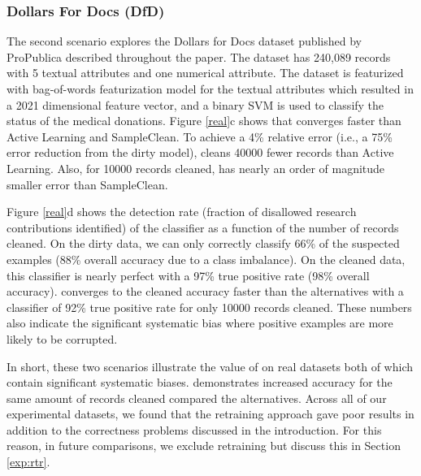 \subsubsection{Dollars For Docs (DfD)}\label{exp:dfd}
The second scenario explores the Dollars for Docs dataset published by ProPublica described throughout the paper.
The dataset has 240,089 records with 5 textual attributes and one numerical attribute.
The dataset is featurized with bag-of-words featurization model for the textual attributes which resulted in a 2021 dimensional feature vector, and a binary SVM is used to classify the status of the medical donations.
Figure \ref{real}c shows that \sys converges faster than Active Learning and SampleClean.
To achieve a 4\% relative error (i.e., a 75\% error reduction from the dirty model), \sys cleans 40000 fewer records than Active Learning.
Also, for 10000 records cleaned, \sys has nearly an order of magnitude smaller error than SampleClean.

Figure \ref{real}d shows the detection rate (fraction of disallowed research contributions identified) of the classifier as a function of the number of records cleaned. 
On the dirty data, we can only correctly classify 66\% of the suspected examples (88\% overall accuracy due to a class imbalance).
On the cleaned data, this classifier is nearly perfect with a 97\% true positive rate (98\% overall accuracy).
\sys converges to the cleaned accuracy faster than the alternatives with a classifier of 92\% true positive rate for only 10000 records cleaned.
These numbers also indicate the significant systematic bias where positive examples are more likely to be corrupted.

In short, these two scenarios illustrate the value of \sys on real datasets both of which contain significant systematic biases.
\sys demonstrates increased accuracy for the same amount of records cleaned compared the alternatives.
Across all of our experimental datasets, we found that the retraining approach gave poor results in addition to the correctness problems discussed in the introduction.
For this reason, in future comparisons, we exclude retraining but discuss this in Section \ref{exp:rtr}.

